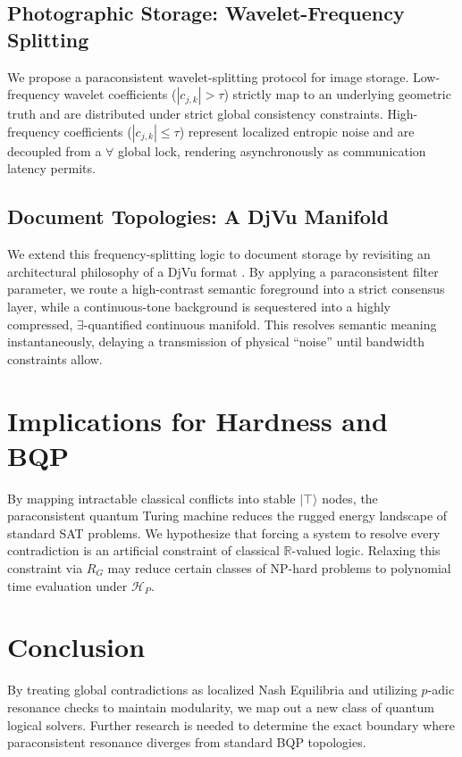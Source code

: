 \documentclass[conference]{IEEEtran}
\newcommand{\ket}[1]{|#1\rangle}
\begin{document}
\subsection{Photographic Storage: Wavelet-Frequency Splitting}
We propose a paraconsistent wavelet-splitting protocol for image storage. Low-frequency wavelet coefficients ($|c_{j,k}| > \tau$) strictly map to an underlying geometric truth and are distributed under strict global consistency constraints. High-frequency coefficients ($|c_{j,k}| \le \tau$) represent localized entropic noise and are decoupled from a $\forall$ global lock, rendering asynchronously as communication latency permits.

\subsection{Document Topologies: A DjVu Manifold}
We extend this frequency-splitting logic to document storage by revisiting an architectural philosophy of a DjVu format \cite{bottou1998high}. By applying a paraconsistent filter parameter, we route a high-contrast semantic foreground into a strict consensus layer, while a continuous-tone background is sequestered into a highly compressed, $\exists$-quantified continuous manifold. This resolves semantic meaning instantaneously, delaying a transmission of physical ``noise'' until bandwidth constraints allow.

\section{Implications for Hardness and BQP}
By mapping intractable classical conflicts into stable $\ket{\top}$ nodes, the paraconsistent quantum Turing machine reduces the rugged energy landscape of standard SAT problems. We hypothesize that forcing a system to resolve every contradiction is an artificial constraint of classical $\mathbb{R}$-valued logic. Relaxing this constraint via $R_G$ may reduce certain classes of NP-hard problems to polynomial time evaluation under $\mathcal{H}_P$.

\section{Conclusion}
By treating global contradictions as localized Nash Equilibria and utilizing $p$-adic resonance checks to maintain modularity, we map out a new class of quantum logical solvers. Further research is needed to determine the exact boundary where paraconsistent resonance diverges from standard BQP topologies.
\end{document}
